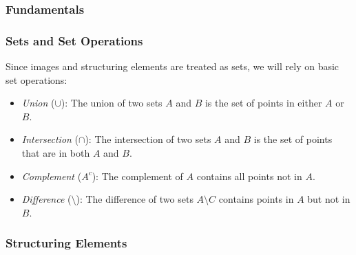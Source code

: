 \documentclass[a4paper,12pt]{article}
\begin{document}


\subsubsection{Fundamentals}


\subsubsection{Sets and Set Operations}

Since images and structuring elements are treated as sets, we will rely on basic set operations:
\begin{itemize}
    \item \emph{Union} (\(\cup\)): The union of two sets \(A\) and \(B\) is the set of points in either \(A\) or \(B\).
    \item \emph{Intersection} (\(\cap\)): The intersection of two sets \(A\) and \(B\) is the set of points that are in both \(A\) and \(B\).
    \item \emph{Complement} (\(A^c\)): The complement of \(A\) contains all points not in \(A\).
    \item \emph{Difference} (\(\setminus\)): The difference of two sets \(A \setminus C\) contains points in \(A\) but not in \(B\).
\end{itemize}

\subsubsection{Structuring Elements}
\end{document}
